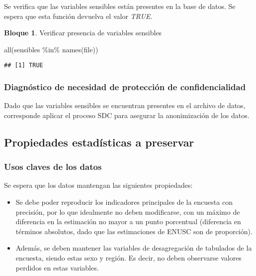 \documentclass[
]{book}
\newenvironment{Shaded}{\begin{snugshade}}{\end{snugshade}}
\newcommand{\FunctionTok}[1]{\textcolor[rgb]{0.00,0.00,0.00}{#1}}
\newcommand{\NormalTok}[1]{#1}
\newcommand{\SpecialCharTok}[1]{\textcolor[rgb]{0.00,0.00,0.00}{#1}}
\theoremstyle{definition}
\theoremstyle{definition}
\newtheorem{example}{Bloque}[chapter]
\theoremstyle{definition}
\theoremstyle{definition}
\theoremstyle{remark}
\begin{document}
Se verifica que las variables sensibles están presentes en la base de datos. Se espera que esta función devuelva el valor \emph{TRUE}.

\begin{example}
\protect\hypertarget{exm:bloque8nbm}{}\label{exm:bloque8nbm}Verificar presencia de variables sensibles
\end{example}

\begin{Shaded}
\begin{Highlighting}[]
\FunctionTok{all}\NormalTok{(sensibles }\SpecialCharTok{\%in\%} \FunctionTok{names}\NormalTok{(file))}
\end{Highlighting}
\end{Shaded}

\begin{verbatim}
## [1] TRUE
\end{verbatim}

\hypertarget{diagnuxf3stico-de-necesidad-de-protecciuxf3n-de-confidencialidad}{%
\subsubsection{Diagnóstico de necesidad de protección de confidencialidad}\label{diagnuxf3stico-de-necesidad-de-protecciuxf3n-de-confidencialidad}}

Dado que las variables sensibles se encuentran presentes en el archivo de datos, corresponde aplicar el proceso SDC para asegurar la anonimización de los datos.

\hypertarget{propiedades-estaduxedsticas-a-preservar}{%
\subsection{Propiedades estadísticas a preservar}\label{propiedades-estaduxedsticas-a-preservar}}

\hypertarget{usos-claves-de-los-datos}{%
\subsubsection{Usos claves de los datos}\label{usos-claves-de-los-datos}}

Se espera que los datos mantengan las siguientes propiedades:

\begin{itemize}
\item
  Se debe poder reproducir los indicadores principales de la encuesta con precisión, por lo que idealmente no deben modificarse, con un máximo de diferencia en la estimación no mayor a un punto porcentual (diferencia en términos absolutos, dado que las estimaciones de ENUSC son de proporción).
\item
  Además, se deben mantener las variables de desagregación de tabulados de la encuesta, siendo estas sexo y región. Es decir, no deben observarse valores perdidos en estas variables.
\end{itemize}
\end{document}
